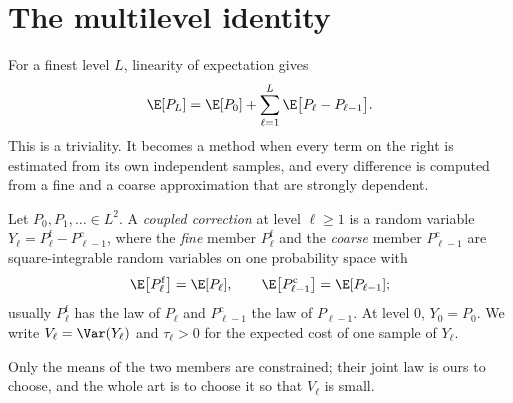 \section{The multilevel identity}\label{sec:ml-identity}

For a finest level $L$, linearity of expectation gives
\begin{equation}\label{eq:ml-telescoping}
  \E[P_L]=\E[P_0]+\sum_{\ell=1}^L\E\big[P_\ell-P_{\ell-1}\big].
\end{equation}
This is a triviality. It becomes a method when every term on the right is estimated from
its own independent samples, and every difference is computed from a fine and a coarse
approximation that are strongly dependent.

\begin{definition}\label{def:ml-coupled}
Let $P_0,P_1,\dots\in L^2$. A \emph{coupled correction} at level $\ell\ge1$ is a random
variable $Y_\ell=P^{\mathrm f}_\ell-P^{\mathrm c}_{\ell-1}$, where the \emph{fine} member
$P^{\mathrm f}_\ell$ and the \emph{coarse} member $P^{\mathrm c}_{\ell-1}$ are square-integrable
random variables on one probability space with
\[
  \E\big[P^{\mathrm f}_\ell\big]=\E[P_\ell],\qquad \E\big[P^{\mathrm c}_{\ell-1}\big]=\E[P_{\ell-1}];
\]
usually $P^{\mathrm f}_\ell$ has the law of $P_\ell$ and $P^{\mathrm c}_{\ell-1}$ the law of
$P_{\ell-1}$. At level $0$, $Y_0=P_0$. We write $V_\ell=\Var(Y_\ell)$ and $\tau_\ell>0$ for
the expected cost of one sample of $Y_\ell$.
\end{definition}

Only the means of the two members are constrained; their joint law is ours to choose, and
the whole art is to choose it so that $V_\ell$ is small.

